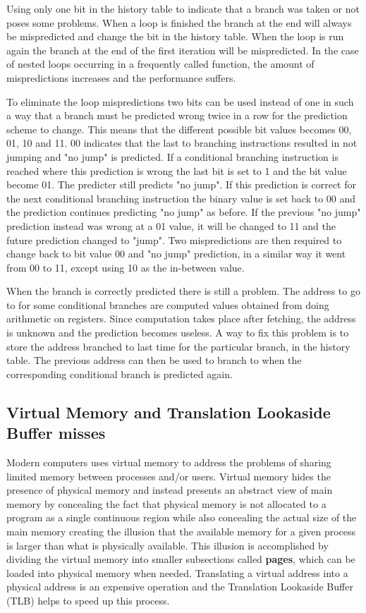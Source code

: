 Using only one bit in the history table to indicate that a branch was taken or not poses some problems.
When a loop is finished the branch at the end will always be mispredicted and change the bit in the history table.
When the loop is run again the branch at the end of the first iteration will be mispredicted.
In the case of nested loops occurring in a frequently called function, the amount of mispredictions increases and the performance suffers.

To eliminate the loop mispredictions two bits can be used instead of one in such a way that a branch must be predicted wrong twice in a row for the prediction scheme to change.
This means that the different possible bit values becomes
00, 01, 10 and 11.
00 indicates that the last to branching instructions resulted in not jumping and "no jump" is predicted. If a conditional branching instruction is reached where this prediction is wrong the last bit is set to 1 and the bit value become 01. The predicter still predicts "no jump".
If this prediction is correct for the next conditional branching instruction the binary value is set back to 00 and the prediction continues predicting "no jump" as before.
If the previous "no jump" prediction instead was wrong at a 01 value, it will be changed to 11 and the future prediction changed to "jump".
Two mispredictions are then required to change back to bit value 00 and "no jump" prediction, in a similar way it went from 00 to 11, except using 10 as the in-between value.

When the branch is correctly predicted there is still a problem.
The address to go to for some conditional branches are computed values obtained from doing arithmetic on registers. 
Since computation takes place after fetching, the address is unknown and the prediction becomes useless. 
A way to fix this problem is to store the address branched to last time for the particular branch, in the history table.
The previous address can then be used to branch to when the corresponding conditional branch is predicted again.


\subsection{Virtual Memory and Translation Lookaside Buffer misses}
Modern computers uses virtual memory to address the problems of sharing limited memory between processes and/or users.
Virtual memory hides the presence of physical memory and instead presents an abstract view of main memory by concealing the fact that physical memory is not allocated to a program as a single continuous region while also concealing the actual size of the main memory creating the illusion that the available memory for a given process is larger than what is physically available.
This illusion is accomplished by dividing the virtual memory into smaller subsections called \textbf{pages}, which can be loaded into physical memory when needed.
Translating a virtual address into a physical address is an expensive operation and the Translation Lookaside Buffer (TLB) helps to speed up this process.

